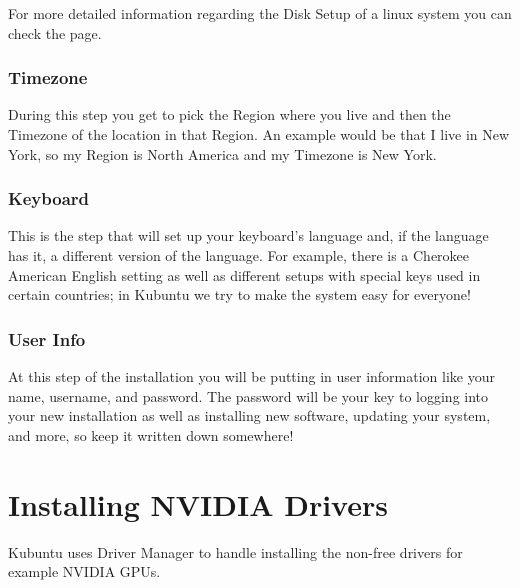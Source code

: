 \documentclass[letterpaper,10pt,english]{sphinxmanual}
\begin{document}
For more detailed information regarding the Disk Setup of a linux system you can check the  page.


\subsection{Timezone}
\label{\detokenize{docs/installation:timezone}}
During this step you get to pick the Region where you live and then the Timezone of the location in that Region. An example would be that I live in New York, so my Region is North America and my Timezone is New York.



\subsection{Keyboard}
\label{\detokenize{docs/installation:keyboard}}
This is the step that will set up your keyboard’s language and, if the language has it, a different version of the language. For example, there is a Cherokee American English setting as well as different setups with special keys used in certain countries; in Kubuntu we try to make the system easy for everyone!



\subsection{User Info}
\label{\detokenize{docs/installation:user-info}}
At this step of the installation you will be putting in user information like your name, username, and password. The password will be your key to logging into your new installation as well as installing new software, updating your system, and more, so keep it written down somewhere!



\chapter{Installing NVIDIA Drivers}
\label{\detokenize{docs/driver-manager:installing-nvidia-drivers}}\label{\detokenize{docs/driver-manager:driver-manager-link}}\label{\detokenize{docs/driver-manager::doc}}
Kubuntu uses Driver Manager to handle installing the non-free drivers for example NVIDIA GPUs.
\end{document}
